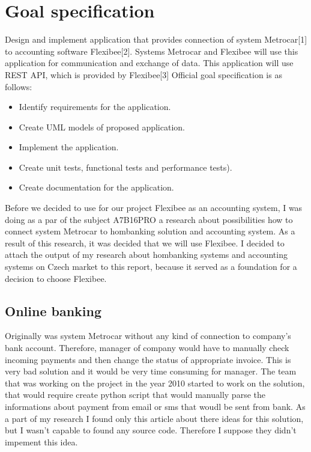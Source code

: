 \documentclass[11pt,twoside,a4paper]{book}
\begin{document}
\section{Goal specification}
Design and implement application that provides connection of system Metrocar[1] to accounting software Flexibee[2]. Systems Metrocar and Flexibee will use this application for communication and exchange of data. This application will use REST API, which is provided by Flexibee[3]
Official goal specification is as follows:
\begin{itemize}
\item Identify requirements for the application.
\item Create UML models of proposed application.
\item Implement the application.
\item Create unit tests, functional tests and performance tests).
\item Create documentation for the application.
\end{itemize}

Before we decided to use for our project Flexibee as an accounting system, I was doing as a par of the subject 
A7B16PRO a research about possibilities how to connect system Metrocar to hombanking solution and accounting system.
As a result of this research, it was decided that we will use Flexibee. I decided to attach the output of my research about hombanking systems and accounting systems on Czech market to this report, because it served as a foundation for a decision to 
choose Flexibee. 

\subsection{Online banking}
Originally was system Metrocar without any kind of connection to company's bank account. Therefore, manager of company would 
have to manually check incoming payments and then change the status of appropriate invoice. This is very bad solution and it 
would be very time consuming for manager. The team that was working on the project in the year 2010 started to work on the solution, that would require create python script that would manually parse the informations about payment from email or sms that woudl be sent from bank\cite{reserse2010}. As a part of my research I found only this article about there ideas for this solution, but I wasn't capable to found any source code. Therefore I suppose they didn't impement this idea. 
\end{document}
